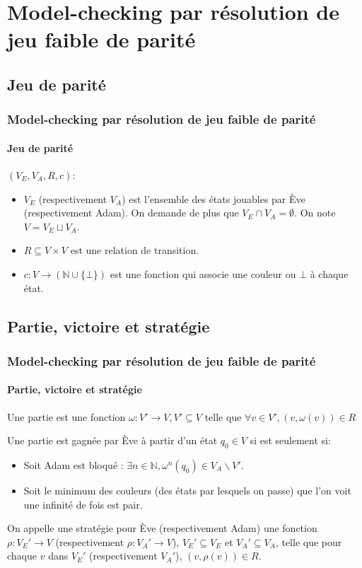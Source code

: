 \documentclass[11pt]{beamer}
\begin{document}
\section{Model-checking par résolution de jeu faible de parité}
\subsection{Jeu de parité}
\begin{frame}
	\frametitle{Model-checking par résolution de jeu faible de parité}
    \framesubtitle{Jeu de parité}

    $(V_E, V_A, R, c)$:
    \begin{itemize}
        \item $V_E$ (respectivement $V_A$) est l'ensemble des états jouables par Ève (respectivement Adam). On demande de plus que $V_E \cap V_A = \emptyset$. On note $V = V_E \sqcup V_A$.
        \item $R \subseteq V \times V$ est une relation de transition.
        \item $c : V \to (\mathbb{N} \cup \{\bot\})$ est une fonction qui associe une couleur ou $\bot$ à chaque état.
    \end{itemize}
\end{frame}

\subsection{Partie, victoire et stratégie}
\begin{frame}
    \frametitle{Model-checking par résolution de jeu faible de parité}
    \framesubtitle{Partie, victoire et stratégie}

    Une partie est une fonction $\omega : V' \to V, V' \subseteq V$ telle que $\forall v \in V', (v,\omega(v)) \in R$

    \pause
    \bigskip

    Une partie est gagnée par Ève à partir d'un état $q_0 \in V$ si est seulement si:
    \begin{itemize}
    \item Soit Adam est bloqué : $\exists n \in \mathbb{N}, \omega^n (q_0) \in V_A\backslash V'$.
    \item Soit le minimum des couleurs (des états par lesquels on passe) que l'on voit une infinité de fois est pair.
    \end{itemize}

    \pause
    \bigskip

    On appelle une stratégie pour Ève (respectivement Adam) une fonction $\rho : V_E' \to V$ (respectivement $\rho : V_A' \to V$), $V_E' \subseteq V_E$ et $V_A' \subseteq V_A$, telle que pour chaque $v$ dans $V_E'$ (respectivement $V_A'$), $(v, \rho(v)) \in R$.
\end{frame}
\end{document}

